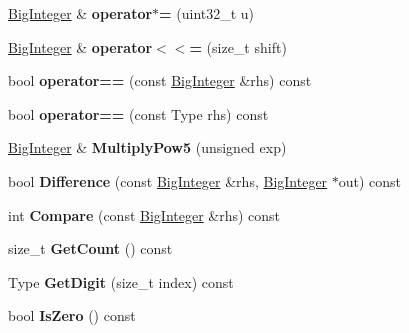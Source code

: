 \begin{DoxyCompactItemize}
\item 
\hyperlink{classinternal_1_1_big_integer}{Big\+Integer} \& {\bfseries operator$\ast$=} (uint32\+\_\+t u)\hypertarget{classinternal_1_1_big_integer_a83e8e464b7bc31c8b2c943f8563b2226}{}\label{classinternal_1_1_big_integer_a83e8e464b7bc31c8b2c943f8563b2226}

\item 
\hyperlink{classinternal_1_1_big_integer}{Big\+Integer} \& {\bfseries operator$<$$<$=} (size\+\_\+t shift)\hypertarget{classinternal_1_1_big_integer_a48b12ef4676f19290dfd5816a4ef4a88}{}\label{classinternal_1_1_big_integer_a48b12ef4676f19290dfd5816a4ef4a88}

\item 
bool {\bfseries operator==} (const \hyperlink{classinternal_1_1_big_integer}{Big\+Integer} \&rhs) const \hypertarget{classinternal_1_1_big_integer_a567ecda3009de20400a2af649fb87e60}{}\label{classinternal_1_1_big_integer_a567ecda3009de20400a2af649fb87e60}

\item 
bool {\bfseries operator==} (const Type rhs) const \hypertarget{classinternal_1_1_big_integer_a329eddac1b724f82d56af2ee2c8abcc4}{}\label{classinternal_1_1_big_integer_a329eddac1b724f82d56af2ee2c8abcc4}

\item 
\hyperlink{classinternal_1_1_big_integer}{Big\+Integer} \& {\bfseries Multiply\+Pow5} (unsigned exp)\hypertarget{classinternal_1_1_big_integer_a98a13f169c27d1acfa57054f37c61763}{}\label{classinternal_1_1_big_integer_a98a13f169c27d1acfa57054f37c61763}

\item 
bool {\bfseries Difference} (const \hyperlink{classinternal_1_1_big_integer}{Big\+Integer} \&rhs, \hyperlink{classinternal_1_1_big_integer}{Big\+Integer} $\ast$out) const \hypertarget{classinternal_1_1_big_integer_a5741304ce36392adeef716e78b384b61}{}\label{classinternal_1_1_big_integer_a5741304ce36392adeef716e78b384b61}

\item 
int {\bfseries Compare} (const \hyperlink{classinternal_1_1_big_integer}{Big\+Integer} \&rhs) const \hypertarget{classinternal_1_1_big_integer_afd8b15480df5003ee6b6e1b8ecbf5f45}{}\label{classinternal_1_1_big_integer_afd8b15480df5003ee6b6e1b8ecbf5f45}

\item 
size\+\_\+t {\bfseries Get\+Count} () const \hypertarget{classinternal_1_1_big_integer_a720114cef0871c9f9c3c6a5f3a66e66a}{}\label{classinternal_1_1_big_integer_a720114cef0871c9f9c3c6a5f3a66e66a}

\item 
Type {\bfseries Get\+Digit} (size\+\_\+t index) const \hypertarget{classinternal_1_1_big_integer_a92c6854f2388875374cfb9801bea0cc8}{}\label{classinternal_1_1_big_integer_a92c6854f2388875374cfb9801bea0cc8}

\item 
bool {\bfseries Is\+Zero} () const \hypertarget{classinternal_1_1_big_integer_a99cf9cb87491a583c6b7614b0c8654fe}{}\label{classinternal_1_1_big_integer_a99cf9cb87491a583c6b7614b0c8654fe}

\end{DoxyCompactItemize}


